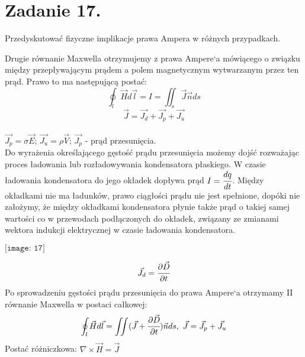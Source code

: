 \section*{Zadanie 17.}
\begin{task}
Przedyskutować fizyczne implikacje prawa Ampera w różnych przypadkach.\\
\end{task}

\begin{solution}
Drugie równanie Maxwella otrzymujemy z prawa Ampere`a mówiącego o związku między przepływającym prądem a polem magnetycznym wytwarzanym przez ten prąd. Prawo to ma następującą postać:
$$\oint_{l}\vec{H}d\vec{l}=I=\iint_{s}\vec{J}\vec{n}ds$$
$$\vec{J}=\vec{J_{d}}+\vec{J_{p}}+\vec{J_{u}}$$\\
$\vec{J_{p}}=\sigma\vec{E}$; $\vec{J_{u}}=\rho\vec{V}$; $\vec{J_{p}}$ - prąd przesunięcia.\\
Do wyrażenia określającego gęstość prądu przesunięcia możemy dojść rozważając proces ładowania lub rozładowywania kondensatora płaskiego. W czasie ładowania kondensatora do jego okładek dopływa prąd $I=\cfrac{dq}{dt}$. Między okładkami nie ma ładunków, prawo ciągłości prądu nie jest spełnione, dopóki nie założymy, że między okładkami kondensatora płynie także prąd o takiej samej wartości co w przewodach podłączonych do okładek, związany ze zmianami wektora indukcji elektrycznej w czasie ładowania kondensatora.\\

\begin{center}
$\texttt{[image: 17]}$\\
\end{center}

$$\vec{J_{d}}=\cfrac{\partial\vec{D}}{\partial t}$$
Po sprowadzeniu gęstości prądu przesunięcia do prawa Ampere`a otrzymamy II równanie Maxwella w postaci całkowej:
$$\oint_{l}\vec{H}d\vec{l}=\iint(\vec{J}+\cfrac{\partial\vec{D}}{\partial t})\vec{n}ds, \ \vec{J}=\vec{J_{p}}+\vec{J_{u}}$$
Postać różniczkowa: $\nabla\times\vec{H}=\vec{J}$


\end{solution}

